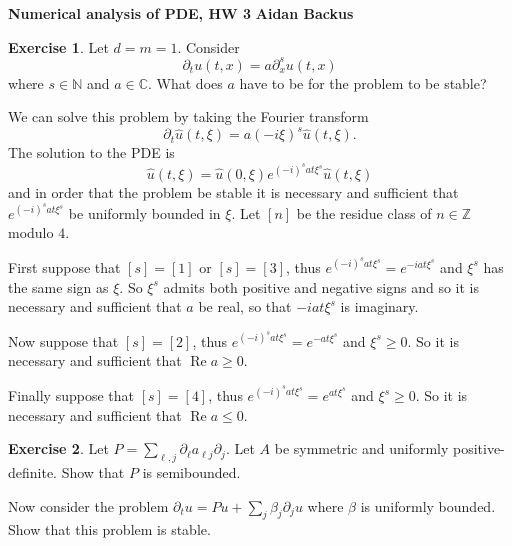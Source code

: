 \documentclass[10pt]{article}
\newcommand{\NN}{\mathbb{N}}
\newcommand{\ZZ}{\mathbb{Z}}
\newcommand{\CC}{\mathbb{C}}
\renewcommand{\Re}{\operatorname{Re}}
\theoremstyle{definition}
\newtheorem{exer}{Exercise}
\begin{document}
\noindent
\large\textbf{Numerical analysis of PDE, HW 3} \hfill \textbf{Aidan Backus} \\

\begin{exer}
Let $d = m = 1$. Consider
$$\partial_t u(t, x) = a \partial^s_x u(t, x)$$
where $s \in \NN$ and $a \in \CC$.
What does $a$ have to be for the problem to be stable?
\end{exer}

We can solve this problem by taking the Fourier transform
$$\partial_t \hat u(t, \xi) = a (-i\xi)^s \hat u(t, \xi).$$
The solution to the PDE is
$$\hat u(t, \xi) = \hat u(0, \xi) e^{(-i)^sa t \xi^s} \hat u(t, \xi)$$
and in order that the problem be stable it is necessary and sufficient that $e^{(-i)^sat\xi^s}$ be uniformly bounded in $\xi$.
Let $[n]$ be the residue class of $n \in \ZZ$ modulo $4$.

First suppose that $[s] = [1]$ or $[s] = [3]$, thus $e^{(-i)^sat\xi^s} = e^{-iat \xi^s}$ and $\xi^s$ has the same sign as $\xi$.
So $\xi^s$ admits both positive and negative signs and so it is necessary and sufficient that $a$ be real, so that $-iat \xi^s$ is imaginary.

Now suppose that $[s] = [2]$, thus $e^{(-i)^sat\xi^s} = e^{-at \xi^s}$ and $\xi^s \geq 0$.
So it is necessary and sufficient that $\Re a \geq 0$.

Finally suppose that $[s] = [4]$, thus $e^{(-i)^sat\xi^s} = e^{at\xi^s}$ and $\xi^s \geq 0$.
So it is necessary and sufficient that $\Re a \leq 0$.

\begin{exer}
Let $P = \sum_{\ell,j} \partial_\ell a_{\ell j} \partial_j$.
Let $A$ be symmetric and uniformly positive-definite. Show that $P$ is semibounded.

Now consider the problem $\partial_t u = Pu + \sum_j \beta_j \partial_j u$ where $\beta$ is uniformly bounded.
Show that this problem is stable.
\end{exer}
\end{document}
